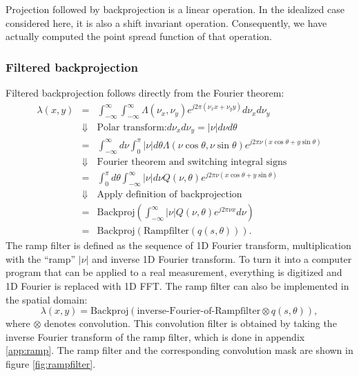 Projection followed by backprojection is a linear operation. In the
idealized case considered here, it is also a shift invariant
operation. Consequently, we have actually computed the point spread function
of that operation.

\subsubsection{Filtered backprojection}
Filtered backprojection follows directly from the Fourier theorem:
\begin{align}
  \lambda(x,y) & = & \int_{-\infty}^{\infty} \int_{-\infty}^{\infty}
         \Lambda(\nu_x, \nu_y) e^{j2\pi (\nu_x x + \nu_y y)} d \nu_x d \nu_y\\
      & \Downarrow & \mbox{Polar transform:} d \nu_x d \nu_y = |\nu|
         d\nu d\theta \nonumber\\
      & = & \int_{-\infty}^{\infty} d\nu \int_0^\pi |\nu| d\theta
            \Lambda(\nu \cos \theta, \nu \sin \theta)
            e^{j2\pi \nu (x \cos \theta + y \sin \theta)}\\
      & \Downarrow & \mbox{Fourier theorem and switching integral signs}
               \nonumber\\
      & = & \int_0^\pi d\theta \int_{-\infty}^{\infty} |\nu| d\nu
            Q(\nu, \theta) e^{j2\pi \nu (x \cos \theta + y \sin \theta)}\\
      & \Downarrow & \mbox{Apply definition of backprojection} \nonumber\\
      & = & \mbox{Backproj} \left( \int_{-\infty}^{\infty}
            |\nu| Q(\nu, \theta) e^{j2\pi \nu x} d\nu \right)\\
      & = & \mbox{Backproj}\left( \mbox{Rampfilter} \left( q(s,\theta) \right)
            \right).
\end{align}
The ramp filter is defined as the sequence of 1D Fourier transform,
multiplication with the ``ramp'' $| \nu |$ and inverse 1D Fourier
transform.  To turn it into a computer program that can be applied to
a real measurement, everything is digitized and 1D Fourier is replaced
with 1D FFT. The ramp filter can also be implemented in the spatial
domain:
\begin{equation}
  \lambda(x,y) = \mbox{Backproj}\left( \mbox{inverse-Fourier-of-Rampfilter} 
                  \otimes q(s, \theta) \right),
\end{equation}
where $\otimes$ denotes convolution. This convolution filter is
obtained by taking the inverse Fourier transform of the ramp filter,
which is done in appendix \ref{app:ramp}. The ramp filter and the
corresponding convolution mask are shown in figure
\ref{fig:rampfilter}.

